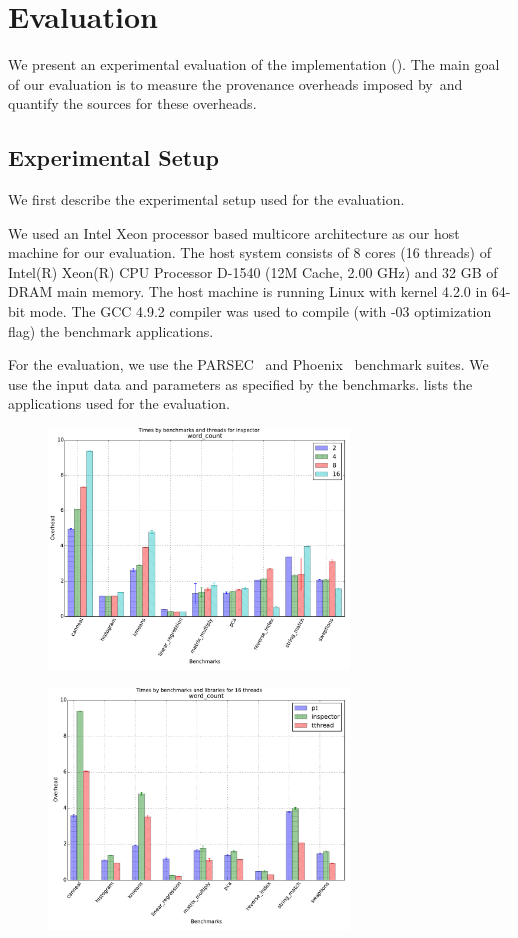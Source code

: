\section{Evaluation}
\label{sec:evaluation}

We present an experimental evaluation of the \projecttitle implementation (). The main goal of our evaluation is to measure the provenance overheads imposed by~\projecttitle and quantify the sources for these overheads.

\subsection{Experimental Setup}
We first describe the experimental setup used for the evaluation.

 We used an Intel Xeon processor based
multicore architecture as our host machine for our evaluation. The
host system consists of 8 cores (16 threads) of Intel(R) Xeon(R) CPU Processor D-1540
(12M Cache, 2.00 GHz) and 32 GB of DRAM main memory. The host
machine is running Linux with kernel 4.2.0 in 64-bit mode.
The GCC 4.9.2 compiler was used to
compile (with -$03$ optimization flag) the benchmark applications.

  For the evaluation, we use the PARSEC~\cite{parsec} and
Phoenix~\cite{phoenix} benchmark suites. We use
the input data and parameters as specified by the
benchmarks.  lists the applications used for the
evaluation.

\begin{figure}[h]
\includegraphics[width=8cm]{figure/benchmarks-inspector.pdf}
\end{figure}

\begin{figure}[h]
\includegraphics[width=8cm]{figure/benchmarks-16.pdf}
\end{figure}

